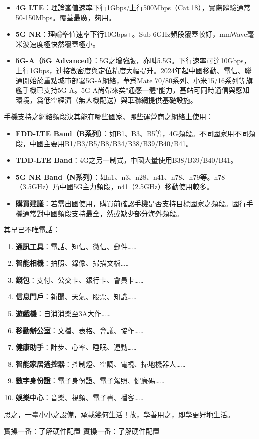 
\begin{itemize}
  \item \textbf{4G LTE}：理論峯值速率下行1Gbps/上行500Mbps（Cat.18），實際體驗通常50-150Mbps。覆蓋最廣，夠用。
  \item \textbf{5G NR}：理論峯值速率下行10Gbps+。Sub-6GHz頻段覆蓋較好，mmWave毫米波速度極快然覆蓋極小。
  \item \textbf{5G-A（5G Advanced）}：5G之增強版，亦叫5.5G。下行速率可達10Gbps，上行1Gbps，連接數密度與定位精度大幅提升。2024年起中國移動、電信、聯通開始於重點城市部署5G-A網絡，華爲Mate 70/80系列、小米15/16系列等旗艦手機已支持5G-A。5G-A尚帶來矣"通感一體"能力，基站可同時通信與感知環境，爲低空經濟（無人機配送）與車聯網提供基礎設施。
\end{itemize}


手機支持之網絡頻段決其能在哪些國家、哪些運營商之網絡上使用：

\begin{itemize}
  \item \textbf{FDD-LTE Band（B系列）}：如B1、B3、B5等，4G頻段。不同國家用不同頻段，中國主要用B1/B3/B5/B8/B34/B38/B39/B40/B41。
  \item \textbf{TDD-LTE Band}：4G之另一制式，中國大量使用B38/B39/B40/B41。
  \item \textbf{5G NR Band（N系列）}：如n1、n3、n28、n41、n78、n79等。n78（3.5GHz）乃中國5G主力頻段，n41（2.5GHz）移動使用較多。
  \item \textbf{購買建議}：若需出國使用，購買前確認手機是否支持目標國家之頻段。國行手機通常對中國頻段支持最全，然或缺少部分海外頻段。
\end{itemize}


其早已不唯電話：

\begin{enumerate}
  \item \textbf{通訊工具}：電話、短信、微信、郵件……
  \item \textbf{智能相機}：拍照、錄像、掃描文檔……
  \item \textbf{錢包}：支付、公交卡、銀行卡、會員卡……
  \item \textbf{信息門戶}：新聞、天氣、股票、知識……
  \item \textbf{遊戲機}：自消消樂至3A大作……
  \item \textbf{移動辦公室}：文檔、表格、會議、協作……
  \item \textbf{健康助手}：計步、心率、睡眠、運動……
  \item \textbf{智能家居遙控器}：控制燈、空調、電視、掃地機器人……
  \item \textbf{數字身份證}：電子身份證、電子駕照、健康碼……
  \item \textbf{娛樂中心}：音樂、視頻、電子書、播客……
\end{enumerate}

思之，一臺小小之設備，承載幾何生活！故，學善用之，即學更好地生活。

\begin{tcbpractice}{實操一番：了解硬件配置}
實操一番：了解硬件配置

\end{tcbpractice}
